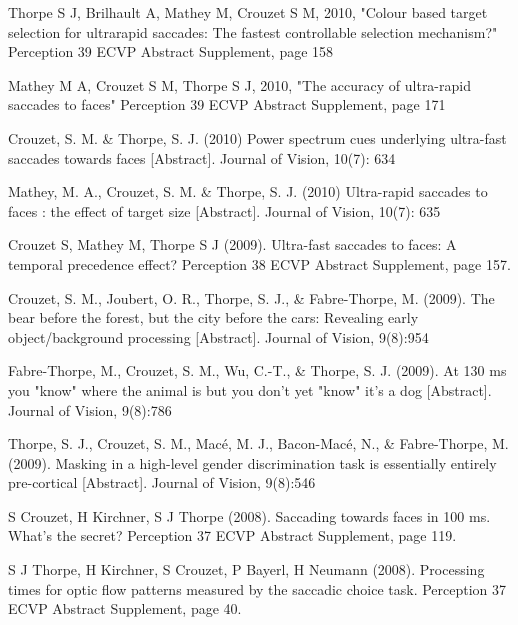 \documentclass[margin,line]{resume}
\begin{document}
\begin{resume}
\vspace{-2mm} Thorpe S J, Brilhault A, Mathey M, Crouzet S M, 2010, "Colour based target selection for ultrarapid saccades: The fastest controllable selection mechanism?" Perception 39 ECVP Abstract Supplement, page 158

\vspace{-2mm} Mathey M A, Crouzet S M, Thorpe S J, 2010, "The accuracy of ultra-rapid saccades to faces" Perception 39 ECVP Abstract Supplement, page 171

\vspace{-2mm} Crouzet, S. M. \& Thorpe, S. J. (2010) Power spectrum cues underlying ultra-fast saccades towards faces [Abstract]. Journal of Vision, 10(7): 634

\vspace{-2mm} Mathey, M. A., Crouzet, S. M. \& Thorpe, S. J. (2010) Ultra-rapid saccades to faces : the effect of target size [Abstract]. Journal of Vision, 10(7): 635

\vspace{-2mm} Crouzet S, Mathey M, Thorpe S J (2009). Ultra-fast saccades to faces: A temporal precedence effect? Perception 38 ECVP Abstract Supplement, page 157.

\vspace{-2mm} Crouzet, S. M., Joubert, O. R., Thorpe, S. J., \& Fabre-Thorpe, M. (2009). The bear before the forest, but the city before the cars: Revealing early object/background processing [Abstract]. Journal of Vision, 9(8):954

\vspace{-2mm} Fabre-Thorpe, M., Crouzet, S. M., Wu, C.-T., \& Thorpe, S. J. (2009). At 130 ms you "know" where the animal is but you don't yet "know" it's a dog [Abstract]. Journal of Vision, 9(8):786

\vspace{-2mm} Thorpe, S. J., Crouzet, S. M., Macé, M. J., Bacon-Macé, N., \& Fabre-Thorpe, M. (2009). Masking in a high-level gender discrimination task is essentially entirely pre-cortical [Abstract]. Journal of Vision, 9(8):546

\vspace{-2mm} S Crouzet, H Kirchner, S J Thorpe (2008). Saccading towards faces in 100 ms. What's the secret? Perception 37 ECVP Abstract Supplement, page 119. 

\vspace{-2mm} S J Thorpe, H Kirchner, S Crouzet, P Bayerl, H Neumann (2008). Processing times for optic flow patterns measured by the saccadic choice task. Perception 37 ECVP Abstract Supplement, page 40.


\end{resume}
\end{document}

